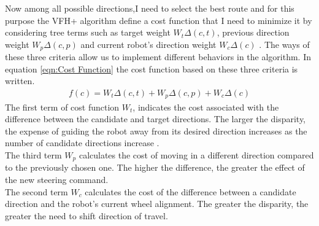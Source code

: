 \noindent Now among all possible directions,I need to select the best route and for this purpose the VFH+ algorithm define a cost function that I need to minimize it by considering tree terms such as target weight $W_t \Delta(c,t)$, previous direction weight $W_p \Delta( c ,p)$ and current robot's direction weight $W_c \Delta (c)$ . The ways of these three criteria allow us to implement different behaviors in the algorithm. In equation \eqref{eqn:Cost Function}
the cost function based on these three criteria is written. 
\begin{equation}
\begin{aligned}
f(c) = W_t \Delta(c,t) + W_p \Delta ( c , p) + W_c \Delta (c)
\end{aligned}
\label{eqn:Cost Function}
\end{equation} 
The first term of cost function $W_t$, indicates the cost associated with the difference between the candidate and target directions. The larger the disparity, the expense of guiding the robot away from its desired direction increases as the number of candidate directions increase \cite{Borenstein1991}.\\
The third term $W_p$ calculates the cost of moving in a different direction compared to the previously chosen one. The higher the difference, the greater the effect of the new steering command\cite{Borenstein1991}.\\
The second term $W_c$ calculates the cost of the difference between a candidate direction and the robot's current wheel alignment. The greater the disparity, the greater the need to shift direction of travel\cite{Borenstein1991}.\\


